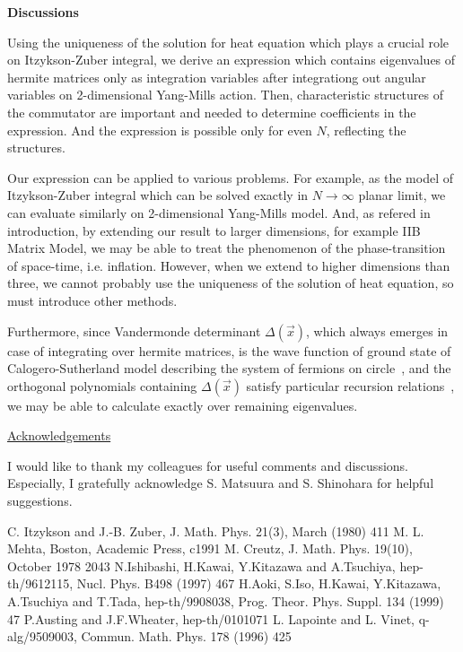 \documentclass[a4paper,12pt]{article}
\begin{document}
\vskip 1.5cm

\noindent
{\bf Discussions}

\vskip 0.5cm

Using the uniqueness of the solution for heat equation which plays a crucial role on Itzykson-Zuber integral, we derive an expression which contains eigenvalues of hermite matrices only as integration variables after integrationg out angular variables on 2-dimensional Yang-Mills action. Then, characteristic structures of the commutator are important and needed to determine coefficients in the expression. And the expression is possible only for even $N$, reflecting the structures.

Our expression can be applied to various problems. For example, as the model of Itzykson-Zuber integral which can be solved exactly in $N\! \to \! \infty$ planar limit, we can evaluate similarly on 2-dimensional Yang-Mills model. And, as refered in introduction, by extending our result to larger dimensions, for example IIB Matrix Model, we may be able to treat the phenomenon of the phase-transition of space-time, i.e. inflation. However, when we extend to higher dimensions than three, we cannot probably use the uniqueness of the solution of heat equation, so must introduce other methods.

Furthermore, since Vandermonde determinant $\Delta (\vec{x})$, which always emerges in case of integrating over hermite matrices, is the wave function of ground state of Calogero-Sutherland model describing the system of fermions on circle~\cite{cs}, and the orthogonal polynomials containing $\Delta (\vec{x})$ satisfy particular recursion relations~\cite{itz}, we may be able to calculate exactly over remaining eigenvalues.

\vskip 1cm

\noindent \underline{ Acknowledgements }

\vskip 0.2cm

I would like to thank my colleagues for useful comments and discussions. Especially, I gratefully acknowledge S. Matsuura and S. Shinohara for helpful suggestions.

\begin{thebibliography}{nn}
\addtolength{\itemsep}{-5pt}
 C. Itzykson and J.-B. Zuber, J. Math. Phys. 21(3), March (1980) 411
 M. L. Mehta, Boston, Academic Press, c1991
 M. Creutz, J. Math. Phys. 19(10), October 1978 2043
 N.Ishibashi, H.Kawai, Y.Kitazawa and A.Tsuchiya, hep-th/9612115, Nucl. Phys. B498 (1997) 467
 H.Aoki, S.Iso, H.Kawai, Y.Kitazawa, A.Tsuchiya and T.Tada, hep-th/9908038, Prog. Theor. Phys. Suppl. 134 (1999) 47
 P.Austing and J.F.Wheater, hep-th/0101071
 L. Lapointe and L. Vinet, q-alg/9509003, Commun. Math. Phys. 178 (1996) 425
\end{thebibliography}
\end{document}
